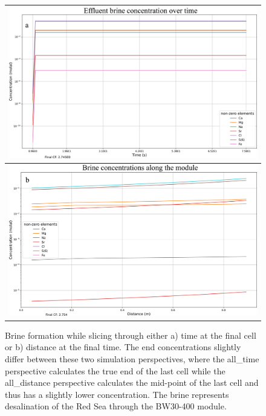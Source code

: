 \begin{supplementary}
\begin{figure}
    \centering
    \begin{tabular}{c}
        \includegraphics[width=0.8\linewidth]{images/ROSSpy/sensitivity_analyses/simulation_perspective/all_time_brine.png} \\ \midrule
        \includegraphics[width=0.8\linewidth]{images/ROSSpy/sensitivity_analyses/simulation_perspective/all_distance_brine.png}
    \end{tabular}
    \caption{
        Brine formation while slicing through either a) time at the final cell or b) distance at the final time. The end concentrations slightly differ between these two simulation perspectives, where the all\_time perspective calculates the true end of the last cell while the all\_distance perspective calculates the mid-point of the last cell and thus has a slightly lower concentration. The brine represents desalination of the Red Sea through the BW30-400 module.
    }
    \label{brine_perspectives}
\end{figure}


\end{supplementary}

